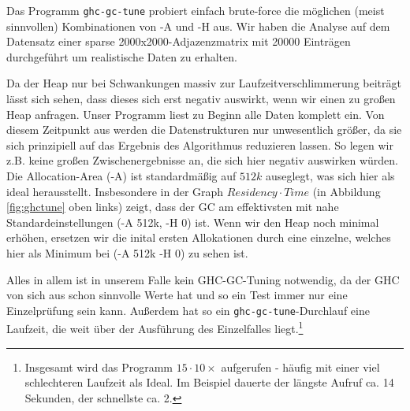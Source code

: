 \documentclass[a4paper]{scrartcl}
\begin{document}
Das Programm \texttt{ghc-gc-tune} probiert einfach brute-force die möglichen (meist sinnvollen) Kombinationen von -A und -H aus. Wir haben die Analyse auf dem Datensatz einer sparse 2000x2000-Adjazenzmatrix mit 20000 Einträgen durchgeführt um realistische Daten zu erhalten.\par
Da der Heap nur bei Schwankungen massiv zur Laufzeitverschlimmerung beiträgt lässt sich sehen, dass dieses sich erst negativ auswirkt, wenn wir einen zu großen Heap anfragen. Unser Programm liest zu Beginn alle Daten komplett ein. Von diesem Zeitpunkt aus werden die Datenstrukturen nur unwesentlich größer, da sie sich prinzipiell auf das Ergebnis des Algorithmus reduzieren lassen. So legen wir z.B. keine großen Zwischenergebnisse an, die sich hier negativ auswirken würden.
Die Allocation-Area (-A) ist standardmäßig auf $512k$ auseglegt, was sich hier als ideal herausstellt. Insbesondere in der Graph $Residency \cdot Time$ (in Abbildung \ref{fig:ghctune} oben links) zeigt, dass der GC am effektivsten mit nahe Standardeinstellungen (-A 512k, -H 0) ist. Wenn wir den Heap noch minimal erhöhen, ersetzen wir die inital ersten Allokationen durch eine einzelne, welches hier als Minimum bei (-A 512k -H 0) zu sehen ist.\par
\medskip
Alles in allem ist in unserem Falle kein GHC-GC-Tuning notwendig, da der GHC von sich aus schon sinnvolle Werte hat und so ein Test immer nur eine Einzelprüfung sein kann. Außerdem hat so ein \texttt{ghc-gc-tune}-Durchlauf eine Laufzeit, die weit über der Ausführung des Einzelfalles liegt.\footnote{Insgesamt wird das Programm $15\cdot10\times$ aufgerufen - häufig mit einer viel schlechteren Laufzeit als Ideal. Im Beispiel dauerte der längste Aufruf ca. 14 Sekunden, der schnellste ca. 2.}
\end{document}
